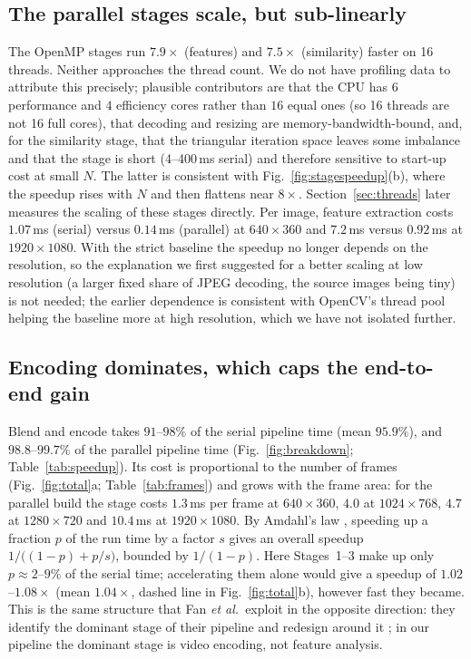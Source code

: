 \documentclass[conference]{IEEEtran}
\begin{document}
\subsection{The parallel stages scale, but sub-linearly}
The OpenMP stages run $7.9\times$ (features) and $7.5\times$ (similarity) faster on 16 threads. Neither approaches the thread count. We do not have profiling data to attribute this precisely; plausible contributors are that the CPU has $6$ performance and $4$ efficiency cores rather than $16$ equal ones (so 16 threads are not 16 full cores), that decoding and resizing are memory-bandwidth-bound, and, for the similarity stage, that the triangular iteration space leaves some imbalance and that the stage is short (4--400\,ms serial) and therefore sensitive to start-up cost at small $N$. The latter is consistent with Fig.~\ref{fig:stagespeedup}(b), where the speedup rises with $N$ and then flattens near $8\times$. Section~\ref{sec:threads} later measures the scaling of these stages directly. Per image, feature extraction costs $1.07$\,ms (serial) versus $0.14$\,ms (parallel) at $640\times360$ and $7.2$\,ms versus $0.92$\,ms at $1920\times1080$. With the strict baseline the speedup no longer depends on the resolution, so the explanation we first suggested for a better scaling at low resolution (a larger fixed share of JPEG decoding, the source images being tiny) is not needed; the earlier dependence is consistent with OpenCV's thread pool helping the baseline more at high resolution, which we have not isolated further.

\subsection{Encoding dominates, which caps the end-to-end gain}
Blend and encode takes $91$--$98\%$ of the serial pipeline time (mean $95.9\%$), and $98.8$--$99.7\%$ of the parallel pipeline time (Fig.~\ref{fig:breakdown}; Table~\ref{tab:speedup}). Its cost is proportional to the number of frames (Fig.~\ref{fig:total}a; Table~\ref{tab:frames}) and grows with the frame area: for the parallel build the stage costs $1.3$\,ms per frame at $640{\times}360$, $4.0$ at $1024{\times}768$, $4.7$ at $1280{\times}720$ and $10.4$\,ms at $1920{\times}1080$. By Amdahl's law \cite{amdahl1967}, speeding up a fraction $p$ of the run time by a factor $s$ gives an overall speedup $1/\big((1-p)+p/s\big)$, bounded by $1/(1-p)$. Here Stages~1--3 make up only $p\approx 2$--$9\%$ of the serial time; accelerating them alone would give a speedup of $1.02$--$1.08\times$ (mean $1.04\times$, dashed line in Fig.~\ref{fig:total}b), however fast they became. This is the same structure that Fan \emph{et al.}\ exploit in the opposite direction: they identify the dominant stage of their pipeline and redesign around it \cite{fan2024}; in our pipeline the dominant stage is video encoding, not feature analysis.
\end{document}
